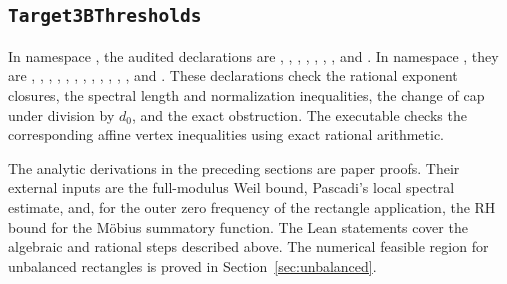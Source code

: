 \documentclass[11pt]{amsart}
\numberwithin{equation}{section}
\theoremstyle{remark}
\begin{document}
\subsection*{\texttt{Target3BThresholds}}
In namespace , the audited
declarations are
, , ,
, ,
, , and
.
In namespace , they are
, , ,
, ,
, ,
, ,
, ,
, and .
These declarations check the rational exponent closures, the
spectral length and normalization inequalities, the change of cap
under division by \(d_0\), and the exact obstruction. The executable
 checks the corresponding
affine vertex inequalities using exact rational arithmetic.

The analytic derivations in the preceding sections are paper proofs.
Their external inputs are the full-modulus Weil bound, Pascadi's
local spectral estimate, and, for the outer zero frequency of the
rectangle application, the RH bound for the M\"obius summatory
function. The Lean statements cover the algebraic and rational
steps described above. The numerical feasible region for unbalanced
rectangles is proved in Section~\ref{sec:unbalanced}.
\par\endgroup
\end{document}
